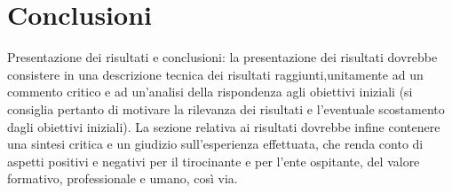 \chapter{Conclusioni}

Presentazione dei risultati e conclusioni: la presentazione dei risultati dovrebbe consistere in una 
descrizione tecnica dei risultati raggiunti,unitamente ad un commento critico e ad un’analisi della rispondenza agli 
obiettivi iniziali (si consiglia pertanto di motivare 
la rilevanza dei risultati e l’eventuale scostamento dagli obiettivi iniziali). La sezione relativa ai risultati dovrebbe 
infine contenere una sintesi critica e un giudizio sull’esperienza effettuata, che renda conto di aspetti positivi e negativi
per il tirocinante e per l’ente ospitante, del valore formativo, professionale e umano, così via.
